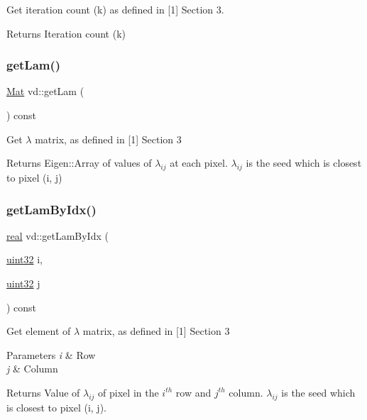 Get iteration count (k) as defined in \mbox{[}1\mbox{]} Section 3. \begin{DoxyReturn}{Returns}
Iteration count (k) 
\end{DoxyReturn}
\mbox{\label{classvd_a37c4ab12669eb276fe7fa4a610310345}} 
\subsubsection{\texorpdfstring{get\+Lam()}{getLam()}}
{\footnotesize\ttfamily \mbox{\hyperlink{typedefs_8cpp_a9fa28c1f74e909474857584f5c7b0088}{Mat}} vd\+::get\+Lam (\begin{DoxyParamCaption}{ }\end{DoxyParamCaption}) const}

Get $\lambda$ matrix, as defined in \mbox{[}1\mbox{]} Section 3 \begin{DoxyReturn}{Returns}
Eigen\+::\+Array of values of $\lambda_{ij}$ at each pixel. $\lambda_{ij}$ is the seed which is closest to pixel (i, j) 
\end{DoxyReturn}
\mbox{\label{classvd_a5c26b069f893aa82eeaf53ff608eda1f}} 
\subsubsection{\texorpdfstring{get\+Lam\+By\+Idx()}{getLamByIdx()}}
{\footnotesize\ttfamily \mbox{\hyperlink{typedefs_8cpp_a58a0c7cf2501f4492da833421be92547}{real}} vd\+::get\+Lam\+By\+Idx (\begin{DoxyParamCaption}\item[{\mbox{\hyperlink{typedefs_8cpp_a8ad23e2333787a214e20a58a284a5a60}{uint32}}}]{i,  }\item[{\mbox{\hyperlink{typedefs_8cpp_a8ad23e2333787a214e20a58a284a5a60}{uint32}}}]{j }\end{DoxyParamCaption}) const}

Get element of $\lambda$ matrix, as defined in \mbox{[}1\mbox{]} Section 3 
\begin{DoxyParams}{Parameters}
{\em i} & Row \\
\hline
{\em j} & Column \\
\hline
\end{DoxyParams}
\begin{DoxyReturn}{Returns}
Value of $\lambda_{ij}$ of pixel in the $ i^{th} $ row and $ j^{th} $ column. $\lambda_{ij}$ is the seed which is closest to pixel (i, j). 
\end{DoxyReturn}
\mbox{\label{classvd_ab0de0a5b8929ed7a7bb6ca902a462dd4}} 
